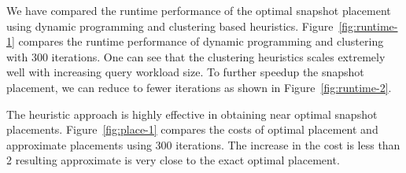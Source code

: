 We have compared the runtime performance of the optimal snapshot placement using
dynamic programming and clustering based heuristics.  Figure~\ref{fig:runtime-1}
compares the runtime performance of dynamic programming and clustering with 300
iterations.  One can see that the clustering heuristics scales extremely well
with increasing query workload size.  To further speedup the snapshot placement,
we can reduce to fewer iterations as shown in Figure~\ref{fig:runtime-2}.

The heuristic approach is highly effective in obtaining near optimal snapshot
placements. Figure~\ref{fig:place-1} compares the costs of optimal placement and
approximate placements using 300 iterations.  The increase in the cost is less
than 2%
resulting approximate is very close to the exact optimal placement.
